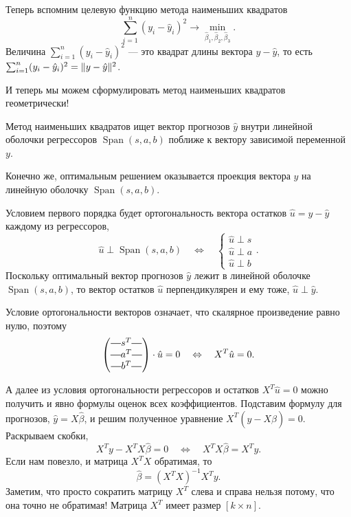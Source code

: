 \documentclass[12pt]{article}
\DeclareMathOperator{\Span}{Span}
\DeclarePairedDelimiter{\norm}{\lVert}{\rVert}
\newcommand*{\horzbar}{\rule[.5ex]{2.5ex}{0.5pt}}
\newcommand{\hb}{\hat{\beta}}
\newcommand{\hu}{\hat{u}}
\newcommand{\hy}{\hat{y}}
\begin{document}
Теперь вспомним целевую функцию метода наименьших квадратов
\[
\sum_{i=1}^n (y_i - \hy_i)^2 \to \min_{\hb_1, \hb_2, \hb_3}.
\]
Величина $\sum_{i=1}^n (y_i - \hy_i)^2$ — это квадрат длины вектора $y - \hy$, то есть $\sum_{i=1}^n (y_i - \hy_i)^2 = \norm{y - \hy}^2$.

И теперь мы можем сформулировать метод наименьших квадратов геометрически!
\begin{explanation}
    Метод наименьших квадратов ищет вектор прогнозов $\hy$ внутри линейной оболочки регрессоров $\Span(s, a, b)$ поближе к вектору  зависимой переменной $y$.
\end{explanation}

Конечно же, оптимальным решением оказывается проекция вектора $y$ на линейную оболочку $\Span(s, a, b)$.


Условием первого порядка будет ортогональность вектора остатков $\hu = y - \hy$ каждому из регрессоров,
\[
\hu \perp \Span(s, a, b) \quad \Leftrightarrow \quad \begin{cases}
    \hu \perp s \\
    \hu \perp a \\
    \hu \perp b
\end{cases}.
\]
Поскольку оптимальный вектор прогнозов $\hy$ лежит в линейной оболочке $\Span(s, a, b)$, то вектор остатков $\hu$ перпендикулярен и ему тоже, $\hu \perp \hy$.

Условие ортогональности векторов означает, что скалярное произведение равно нулю, поэтому
\[
\begin{pmatrix}
    \horzbar s^T \horzbar \\
    \horzbar a^T \horzbar \\
    \horzbar b^T \horzbar \\
\end{pmatrix} \cdot \hu = 0 \quad \Leftrightarrow \quad X^T \hu = 0.
\]

А далее из условия ортогональности регрессоров и остатков $X^T \hu = 0$ можно получить и явно формулы оценок всех коэффициентов.
Подставим формулу для прогнозов, $\hy = X\hb$, и решим полученное уравнение $X^T (y - X\hb) = 0$.
Раскрываем скобки,
\[
X^T y - X^T X\hb = 0 \quad \Leftrightarrow \quad X^TX \hb = X^T y.
\]
Если нам повезло, и матрица $X^TX$ обратимая, то 
\[
\hb = (X^TX)^{-1} X^Ty.
\]
Заметим, что просто сократить матрицу $X^T$ слева и справа нельзя потому, что она точно не обратимая! 
Матрица $X^T$ имеет размер $[k \times n]$.
\end{document}
